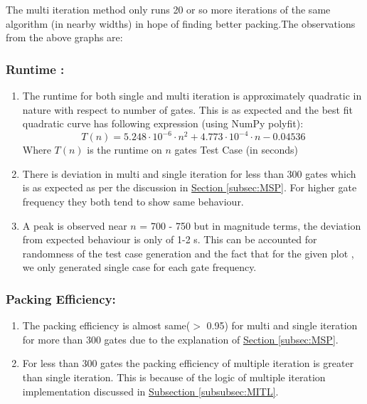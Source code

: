 \documentclass[12pt, a4paper,openany]{article}
\begin{document}
\begin{flushleft}
    The multi iteration method only runs 20 or so more iterations of the same algorithm (in nearby widths) in hope of finding better packing.The observations from the above graphs are:\\
    \subsubsection{Runtime :}
    \begin{enumerate}
        \item The runtime for both single and multi iteration is approximately quadratic in nature with respect to number of gates. This is as expected and the best fit quadratic curve has following expression (using NumPy polyfit):
        \[T(n) = 5.248\cdot 10^{-6}\cdot n^{2} + 4.773\cdot 10^{-4}\cdot n -0.04536\]
        Where \(T(n)\) is the runtime on \(n\) gates Test Case (in seconds)
        \item There is deviation in multi and single iteration for less than 300 gates which is as expected as per the discussion in \hyperref[subsec:MSP]{Section \ref*{subsec:MSP}}. For higher gate frequency they both tend to show same behaviour.
        \item A peak is observed near \(n\) = 700 - 750 but in magnitude terms, the deviation from expected behaviour is only of 1-2 s. This can be accounted for randomness of the test case generation and the fact that for the given plot , we only generated single case for each gate frequency.
    \end{enumerate}
    \subsubsection{Packing Efficiency:}
    \begin{enumerate}
        \item The packing efficiency is almost same($>$ 0.95) for multi and single iteration for more than 300 gates due to the explanation of \hyperref[subsec:MSP]{Section \ref*{subsec:MSP}}.
        \item For less than 300 gates the packing efficiency of multiple iteration is greater than single iteration. This is because of the logic of multiple iteration implementation discussed in \hyperref[subsubsec:MITL]{Subsection \ref*{subsubsec:MITL}}.
    \end{enumerate}


\end{flushleft}
\end{document}
